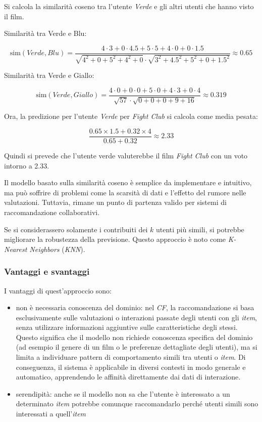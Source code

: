 Si calcola la similarità coseno tra l'utente \textit{Verde} e gli altri utenti che hanno visto il film. 

Similarità tra Verde e Blu:

\[
\text{sim}(Verde, Blu) = \frac{4 \cdot 3 + 0 \cdot 4.5 + 5 \cdot 5 + 4 \cdot 0 + 0 \cdot 1.5}{\sqrt{4^2 + 0 + 5^2 + 4^2 + 0} \cdot \sqrt{3^2 + 4.5^2 + 5^2 + 0 + 1.5^2}} \approx 0.65
\]

Similarità tra Verde e Giallo:

\[
\text{sim}(Verde, Giallo) = \frac{4 \cdot 0 + 0 \cdot 0 + 5 \cdot 0 + 4 \cdot 3 + 0 \cdot 4}{\sqrt{57} \cdot \sqrt{0 + 0 + 0 + 9 + 16}} \approx 0.319
\]

Ora, la predizione per l'utente \textit{Verde} per \textit{Fight Club} si calcola come media pesata:

\[
\frac{0.65 \times 1.5 + 0.32 \times 4}{0.65 + 0.32} \approx 2.33
\]

Quindi si prevede che l'utente verde valuterebbe il film \textit{Fight Club} con un voto intorno a 2.33.

Il modello basato sulla similarità coseno è semplice da implementare e intuitivo, ma può soffrire di problemi come la scarsità di dati e l'effetto del rumore nelle valutazioni. Tuttavia, rimane un punto di partenza valido per sistemi di raccomandazione collaborativi.

Se si considerassero solamente i contribuiti dei $k$ utenti più simili, si potrebbe migliorare la robustezza della previsione. Questo approccio è noto come \textit{K-Nearest Neighbors} (\textit{KNN}).

\subsubsection{Vantaggi e svantaggi}

I vantaggi di quest'approccio sono:

\begin{itemize}
  \item non è necessaria conoscenza del dominio: nel \textit{CF}, la raccomandazione si basa esclusivamente sulle valutazioni o interazioni passate degli utenti con gli \textit{item}, senza utilizzare informazioni aggiuntive sulle caratteristiche degli stessi. Questo significa che il modello non richiede conoscenza specifica del dominio (ad esempio il genere di un film o le preferenze dettagliate degli utenti), ma si limita a individuare pattern di comportamento simili tra utenti o \textit{item}. Di conseguenza, il sistema è applicabile in diversi contesti in modo generale e automatico, apprendendo le affinità direttamente dai dati di interazione.
  \item serendipità: anche se il modello non sa che l'utente è interessato a un determinato \textit{item} potrebbe comunque raccomandarlo perché utenti simili sono interessati a quell'\textit{item}

\end{itemize}

